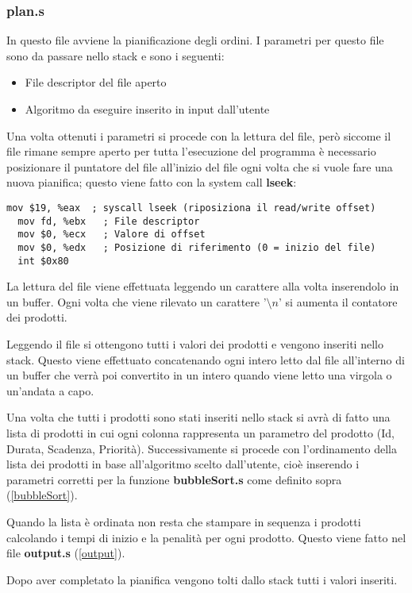 \documentclass[a4paper]{article}
\begin{document}
\subsubsection{plan.s}
In questo file avviene la pianificazione degli ordini. I parametri per questo file sono
da passare nello stack e sono i seguenti:
\begin{itemize}
	\item File descriptor del file aperto
	\item Algoritmo da eseguire inserito in input dall'utente
\end{itemize}
Una volta ottenuti i parametri si procede con la lettura del file, però siccome il file
rimane sempre aperto per tutta l'esecuzione del programma è necessario posizionare il
puntatore del file all'inizio del file ogni volta che si vuole fare una nuova pianifica;
questo viene fatto con la system call \textbf{lseek}:
\begin{lstlisting}[language={[x86masm]Assembler}]
  mov $19, %eax  ; syscall lseek (riposiziona il read/write offset)
  mov fd, %ebx   ; File descriptor
  mov $0, %ecx   ; Valore di offset
  mov $0, %edx   ; Posizione di riferimento (0 = inizio del file)
  int $0x80
\end{lstlisting}
La lettura del file viene effettuata leggendo un carattere alla volta inserendolo in un
buffer. Ogni volta che viene rilevato un carattere '\( \setminus n\)' si aumenta il
contatore dei prodotti.

\noindent Leggendo il file si ottengono tutti i valori dei prodotti e
vengono inseriti nello stack. Questo viene effettuato concatenando ogni intero letto
dal file all'interno di un buffer che verrà poi convertito in un intero quando viene
letto una virgola o un'andata a capo.

\noindent Una volta che tutti i prodotti sono stati inseriti nello stack si avrà di fatto
una lista di prodotti in cui ogni colonna rappresenta un parametro del prodotto (Id, Durata, Scadenza, Priorità).
Successivamente si procede con l'ordinamento della lista dei prodotti in base all'algoritmo scelto dall'utente, cioè
inserendo i parametri corretti per la funzione \textbf{bubbleSort.s} come definito
sopra (\ref{bubbleSort}).

\noindent Quando la lista è ordinata non resta che stampare in sequenza i prodotti
calcolando i tempi di inizio e la penalità per ogni prodotto. Questo viene fatto
nel file \textbf{output.s} (\ref{output}).

\noindent Dopo aver completato la pianifica vengono tolti dallo stack tutti i valori inseriti.
\end{document}
